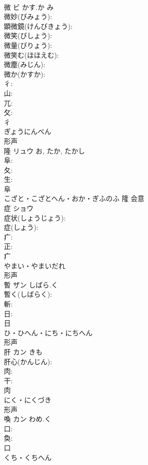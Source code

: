 \documentclass[8pt]{extreport}
\begin{document}
\begin{CJK}{UTF8}{min}
\\	微	ビ	かす.か	み	
\\	微妙(びみょう): 
\\	顕微鏡(けんびきょう): 
\\	微笑(びしょう): 
\\	微量(びりょう): 
\\	微笑む(ほほえむ): 
\\	微塵(みじん): 
\\	微か(かすか): 
\\	彳: 
\\	山: 
\\	兀: 
\\	攵: 
\\	彳	
\\	ぎょうにんべん	
\\	形声 
\\	隆	リュウ		お, たか, たかし	
\\	阜: 
\\	夂: 
\\	生: 
\\	阜	
\\	こざと・こざとへん・おか・ぎふのふ	隆	会意 
\\	症	ショウ			
\\	症状(しょうじょう): 
\\	症(しょう): 
\\	疒: 
\\	正: 
\\	疒	
\\	やまい・やまいだれ	
\\	形声 
\\	暫	ザン	しばら.く		
\\	暫く(しばらく): 
\\	斬: 
\\	日: 
\\	日	
\\	ひ・ひへん・にち・にちへん	
\\	形声 
\\	肝	カン	きも		
\\	肝心(かんじん): 
\\	肉: 
\\	干: 
\\	肉	
\\	にく・にくづき	
\\	形声 
\\	喚	カン	わめ.く		
\\	口: 
\\	奐: 
\\	口	
\\	くち・くちへん	

\end{CJK}
\end{document}
